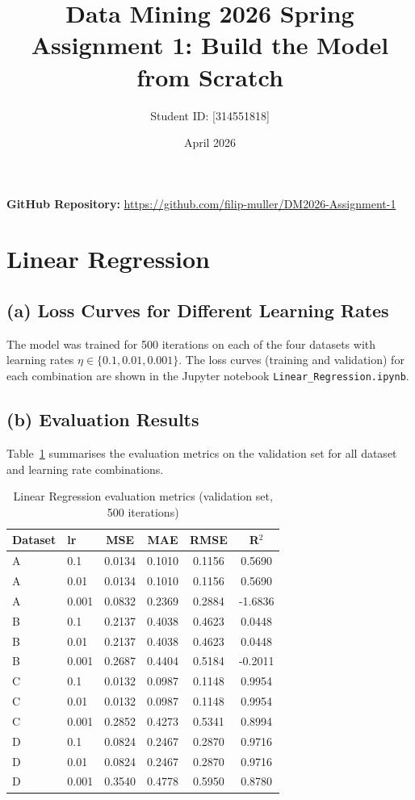 \documentclass[11pt,a4paper]{article}
\title{\textbf{Data Mining 2026 Spring}\\Assignment 1: Build the Model from Scratch}
\author{Student ID: [314551818]}
\date{April 2026}
\begin{document}
\maketitle

\noindent\textbf{GitHub Repository:} \url{https://github.com/filip-muller/DM2026-Assignment-1}

\tableofcontents
\newpage

\section{Linear Regression}

\subsection{(a) Loss Curves for Different Learning Rates}

The model was trained for 500 iterations on each of the four datasets with learning rates $\eta \in \{0.1, 0.01, 0.001\}$. The loss curves (training and validation) for each combination are shown in the Jupyter notebook \texttt{Linear\_Regression.ipynb}.

\subsection{(b) Evaluation Results}

Table~\ref{tab:linreg} summarises the evaluation metrics on the validation set for all dataset and learning rate combinations.

\begin{table}[H]
\centering
\caption{Linear Regression evaluation metrics (validation set, 500 iterations)}
\label{tab:linreg}
\begin{tabular}{llcccc}
\toprule
\textbf{Dataset} & \textbf{lr} & \textbf{MSE} & \textbf{MAE} & \textbf{RMSE} & \textbf{R$^2$} \\
\midrule
A & 0.1   & 0.0134 & 0.1010 & 0.1156 &  0.5690 \\
A & 0.01  & 0.0134 & 0.1010 & 0.1156 &  0.5690 \\
A & 0.001 & 0.0832 & 0.2369 & 0.2884 & -1.6836 \\
\midrule
B & 0.1   & 0.2137 & 0.4038 & 0.4623 &  0.0448 \\
B & 0.01  & 0.2137 & 0.4038 & 0.4623 &  0.0448 \\
B & 0.001 & 0.2687 & 0.4404 & 0.5184 & -0.2011 \\
\midrule
C & 0.1   & 0.0132 & 0.0987 & 0.1148 &  0.9954 \\
C & 0.01  & 0.0132 & 0.0987 & 0.1148 &  0.9954 \\
C & 0.001 & 0.2852 & 0.4273 & 0.5341 &  0.8994 \\
\midrule
D & 0.1   & 0.0824 & 0.2467 & 0.2870 &  0.9716 \\
D & 0.01  & 0.0824 & 0.2467 & 0.2870 &  0.9716 \\
D & 0.001 & 0.3540 & 0.4778 & 0.5950 &  0.8780 \\
\bottomrule
\end{tabular}
\end{table}
\end{document}
